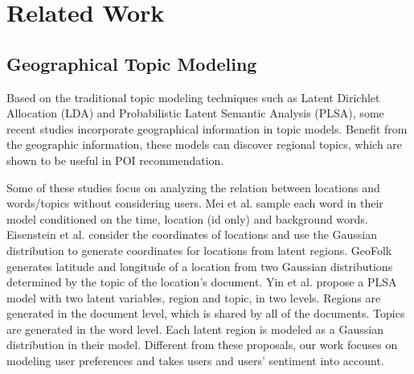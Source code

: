 \section{Related Work}
\label{sec:related}

\subsection{Geographical Topic Modeling}
\label{sec:GTM}
Based on the traditional topic modeling techniques such
as Latent Dirichlet Allocation (LDA) \cite{BleiLDA:2003}
and Probabilistic Latent Semantic Analysis (PLSA),
some recent studies
\cite{Eisenstein:2010,Geofolk:2010,Hong:2012,YuanW4:2013}
incorporate geographical information in topic models.
Benefit from the geographic information, these models
can discover regional topics, which are shown
to be useful in POI recommendation.

Some of these studies
\cite{MeiST:2006, Eisenstein:2010, Geofolk:2010, Sakaki:2010, Yin:2011}
focus on analyzing
the relation between locations and words/topics without considering
users. Mei et al. \cite{MeiST:2006} sample each word in their model
conditioned on the time, location (id only) and background words.
Eisenstein et al. \cite{Eisenstein:2010} consider the coordinates
of locations and use the Gaussian distribution to generate
coordinates for locations from latent regions. GeoFolk
\cite{Geofolk:2010} generates latitude and longitude
of a location from two Gaussian distributions determined by
the topic of the location's document.
Yin et al. \cite{Yin:2011} propose a PLSA model with two latent
variables, region and topic, in two levels.
Regions are generated in the document level, which is shared
by all of the documents. Topics are generated in the word level.
Each latent region is modeled as a Gaussian distribution
in their model. Different from these proposals, our work focuses
on modeling user preferences and takes users and users' sentiment
into account.


